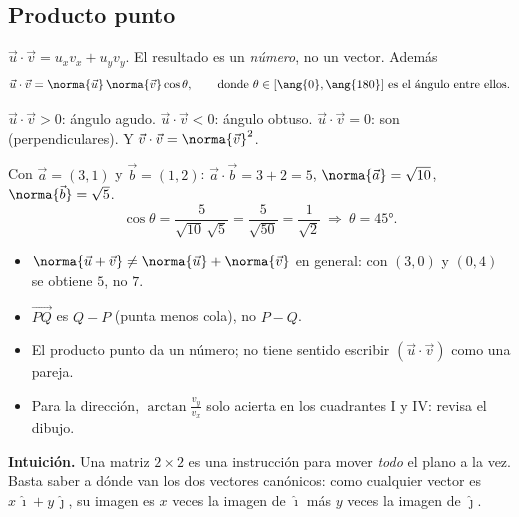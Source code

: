 \documentclass[11pt,a4paper]{article}
\newcommand{\ii}{\hat{\imath}}
\newcommand{\jj}{\hat{\jmath}}
\begin{document}
\subsection{Producto punto}
\begin{definicion}
$\vec u\cdot\vec v=u_xv_x+u_yv_y$. El resultado es un \emph{número}, no un vector. Además
\[ \vec u\cdot\vec v=\norma{\vec u}\,\norma{\vec v}\cos\theta,\qquad\text{donde $\theta\in[\ang{0},\ang{180}]$ es el ángulo entre ellos.} \]
\end{definicion}
\begin{propiedad}
$\vec u\cdot\vec v>0$: ángulo agudo. \quad $\vec u\cdot\vec v<0$: ángulo obtuso. \quad
$\vec u\cdot\vec v=0$: son  (perpendiculares). Y $\vec v\cdot\vec v=\norma{\vec v}^{2}$.
\end{propiedad}
\begin{ejemplo}
Con $\vec a=(3,1)$ y $\vec b=(1,2)$: $\vec a\cdot\vec b=3+2=5$, $\norma{\vec a}=\sqrt{10}$, $\norma{\vec b}=\sqrt5$.
\[ \cos\theta=\frac{5}{\sqrt{10}\,\sqrt5}=\frac{5}{\sqrt{50}}=\frac{1}{\sqrt2}\ \Rightarrow\ \theta=\ang{45}. \]
\end{ejemplo}
\begin{ojo}
\begin{itemize}
\item $\norma{\vec u+\vec v}\neq\norma{\vec u}+\norma{\vec v}$ en general: con $(3,0)$ y $(0,4)$ se obtiene $5$, no $7$.
\item $\overrightarrow{PQ}$ es $Q-P$ (punta menos cola), no $P-Q$.
\item El producto punto da un número; no tiene sentido escribir $(\vec u\cdot\vec v)$ como una pareja.
\item Para la dirección, $\arctan\frac{v_y}{v_x}$ solo acierta en los cuadrantes I y IV: revisa el dibujo.
\end{itemize}
\end{ojo}


\textbf{Intuición.} Una matriz $2\times2$ es una instrucción para mover \emph{todo} el plano a la vez. Basta saber a
dónde van los dos vectores canónicos: como cualquier vector es $x\,\ii+y\,\jj$, su imagen es $x$ veces la imagen de $\ii$
más $y$ veces la imagen de $\jj$.
\end{document}
